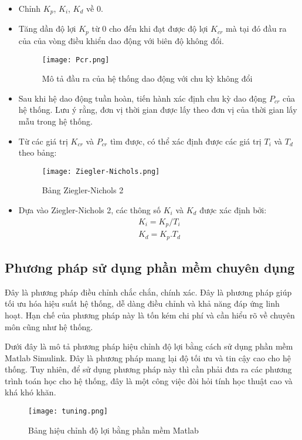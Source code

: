 \begin{itemize}
	\item Chỉnh $K_p$, $K_i$, $K_d$ về 0. 
	\item Tăng dần độ lợi $K_p$ từ 0 cho đến khi đạt được độ lợi $K_{cr}$ mà tại đó đầu ra của của vòng điều khiển dao động với biên độ không đổi.
	\begin{figure}[h!]
		\centering
		\texttt{[image: Pcr.png]}
		\caption[Mô tả đầu ra của hệ thống dao động với chu kỳ không đổi]{Mô tả đầu ra của hệ thống dao động với chu kỳ không đổi}
		\label{fig:Dao động của đầu ra hệ thống}
	\end{figure}
	\item Sau khi hệ dao động tuần hoàn, tiến hành xác định chu kỳ dao động $P_{cr}$ của hệ thống. Lưu ý rằng, đơn vị thời gian được lấy theo đơn vị của thời gian lấy mẫu trong hệ thống.
	
	\newpage
	
	\item Từ các giá trị $K_{cr}$ và $P_{cr}$ tìm được, có thể xác định được các giá trị $T_i$ và $T_d$ theo bảng:


	\begin{figure}[h!]
	 	\centering
		\texttt{[image: Ziegler-Nichols.png]}
		\caption[Bảng Ziegler-Nichols 2]{Bảng Ziegler-Nichols 2}
		\label{fig:Ziegler-Nichols 2}
	\end{figure}
	
	\item Dựa vào Ziegler-Nichols 2, các thông số $K_i$ và $K_d$ được xác định bởi:
	\begin{align}
		K_i = K_p/T_i	\\
		K_d = K_p.T_d
	\end{align}
	
	
\end{itemize}

\newpage

\subsection{Phương pháp sử dụng phần mềm chuyên dụng}

Đây là phương pháp điều chỉnh chắc chắn, chính xác. Đây là phương pháp giúp tối ưu hóa hiệu suất hệ thống, dễ dàng điều chỉnh và khả năng đáp ứng linh hoạt. Hạn chế của phương pháp này là tốn kém chi phí và cần hiểu rõ về chuyên môn cũng như hệ thống.

Dưới đây là mô tả phương pháp hiệu chỉnh độ lợi bằng cách sử dụng phần mềm Matlab Simulink. Đây là phương pháp mang lại độ tối ưu và tin cậy cao cho hệ thống. Tuy nhiên, để sử dụng phương pháp này thì cần phải đưa ra các phương trình toán học cho hệ thống, đây là một công việc đòi hỏi tính học thuật cao và khá khó khăn.

\begin{figure}[h!]
	\centering
	\texttt{[image: tuning.png]}
	\caption[Bảng hiệu chỉnh độ lợi bằng phần mềm Matlab]{Bảng hiệu chỉnh độ lợi bằng phần mềm Matlab}
	\label{fig:Hiệu chỉnh độ lợi bằng phần mềm}
\end{figure}



